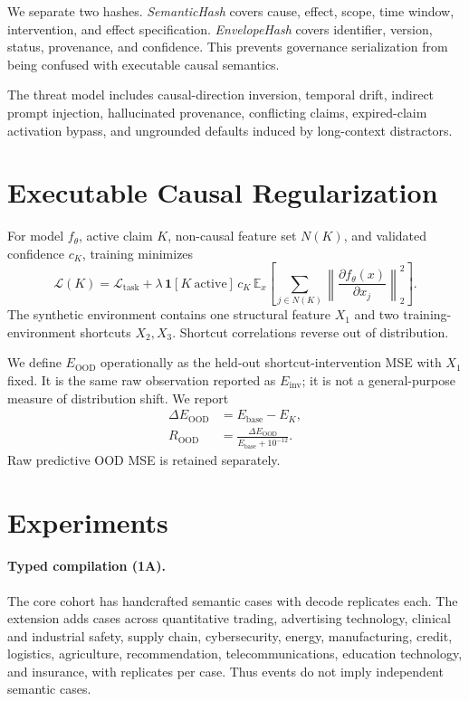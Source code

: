 \documentclass[10pt,twocolumn]{article}
\begin{document}
We separate two hashes. \emph{SemanticHash} covers cause, effect, scope, time window, intervention, and effect specification. \emph{EnvelopeHash} covers identifier, version, status, provenance, and confidence. This prevents governance serialization from being confused with executable causal semantics.

The threat model includes causal-direction inversion, temporal drift, indirect prompt injection, hallucinated provenance, conflicting claims, expired-claim activation bypass, and ungrounded defaults induced by long-context distractors.

\section{Executable Causal Regularization}
For model $f_\theta$, active claim $K$, non-causal feature set $N(K)$, and validated confidence $c_K$, training minimizes
\begin{equation}
\mathcal{L}(K)=\mathcal{L}_{\mathrm{task}}+\lambda\,\mathbf{1}[K\ \mathrm{active}]\,c_K
\,\mathbb{E}_x\!\left[\sum_{j\in N(K)}\left\|\frac{\partial f_\theta(x)}{\partial x_j}\right\|_2^2\right].
\end{equation}
The synthetic environment contains one structural feature $X_1$ and two training-environment shortcuts $X_2,X_3$. Shortcut correlations reverse out of distribution.

We define $E_{\mathrm{OOD}}$ operationally as the held-out shortcut-intervention MSE with $X_1$ fixed. It is the same raw observation reported as $E_{\mathrm{inv}}$; it is not a general-purpose measure of distribution shift. We report
\begin{align}
\Delta E_{\mathrm{OOD}} &= E_{\mathrm{base}}-E_K,\\
R_{\mathrm{OOD}} &= \frac{\Delta E_{\mathrm{OOD}}}{E_{\mathrm{base}}+10^{-12}}.
\end{align}
Raw predictive OOD MSE is retained separately.

\section{Experiments}
\paragraph{Typed compilation (1A).}
The core cohort has \CoreCases{} handcrafted semantic cases with \CoreReplicates{} decode replicates each. The extension adds \ExtensionCases{} cases across quantitative trading, advertising technology, clinical and industrial safety, supply chain, cybersecurity, energy, manufacturing, credit, logistics, agriculture, recommendation, telecommunications, education technology, and insurance, with \ExtensionReplicates{} replicates per case. Thus \TotalEvents{} events do not imply \TotalEvents{} independent semantic cases.
\end{document}
